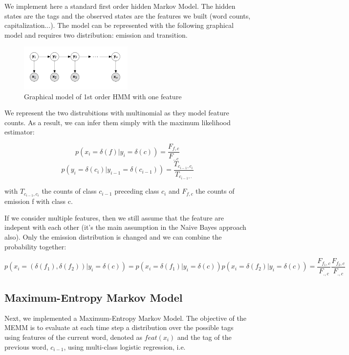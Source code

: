 \documentclass[11pt]{article}
\begin{document}
We implement here a standard first order hidden Markov Model. The hidden states are the tags and the observed states are the features we built (word counts, capitalization...). The model can be represented with the following graphical model and requires two distribution: emission and transition.

\begin{figure}[H]
\begin{center}
    \includegraphics[width=0.5\textwidth]{hmm}
    \caption{Graphical model of 1st order HMM with one feature}
\end{center}
\end{figure}

We represent the two distrubitions with multinomial as they model feature counts. As a result, we can infer them simply with the maximum likelihood estimator:

\[
p(x_i=\delta(f)|y_i=\delta(c)) = \frac{F_{f,c}}{F_{.,c}}
\]
\[
p(y_i=\delta(c_i)|y_{i-1}=\delta(c_{i-1})) = \frac{T_{c_{i-1},c_i}}{T_{c_{i-1},.}}
\]

with $T_{c_{i-1},c_i}$ the counts of class $c_{i-1}$ preceding class $c_i$ and $F_{f,c}$ the counts of emission f with class c.

If we consider multiple features, then we still assume that the feature are indepent with each other (it's the main assumption in the Naive Bayes approach also). Only the emission distribution is changed and we can combine the probability together:

\[
p(x_i=(\delta(f_1), \delta(f_2))|y_i=\delta(c)) = p(x_i=\delta(f_1)|y_i=\delta(c)) p(x_i=\delta(f_2)|y_i=\delta(c)) =
\frac{F_{f_1,c}}{F_{.,c}}  \frac{F_{f_2,c}}{F_{.,c}}
\]




\subsection{Maximum-Entropy Markov Model}

Next, we implemented a Maximum-Entropy Markov Model. The objective of the MEMM is to evaluate at each time step a distribution over the possible tags using features of the current word, denoted as $feat(x_i)$ and the tag of the previous word, $c_{i-1}$, using multi-class logistic regression, i.e.
\end{document}
